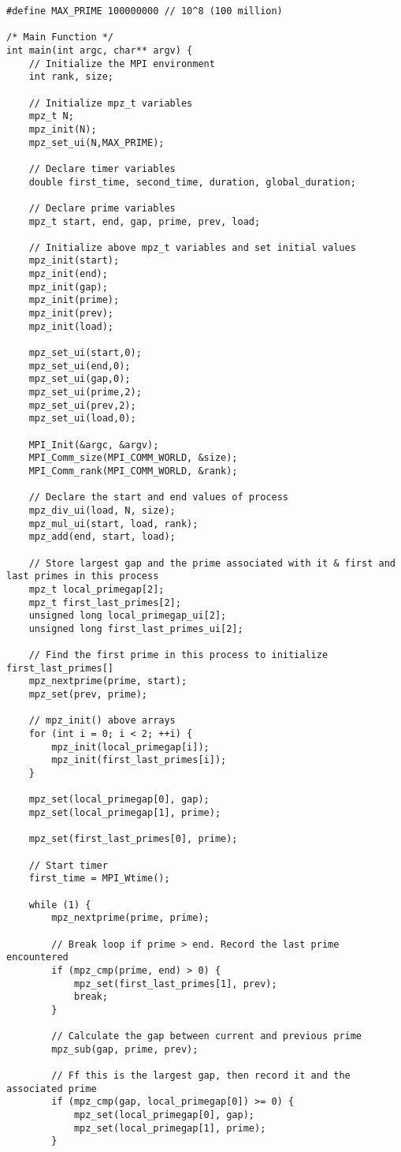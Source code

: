 \documentclass[12pt]{article}
\begin{document}
{\begin{lstlisting}
#define MAX_PRIME 100000000 // 10^8 (100 million)

/* Main Function */
int main(int argc, char** argv) {
	// Initialize the MPI environment
	int rank, size;

	// Initialize mpz_t variables
	mpz_t N;
	mpz_init(N);
	mpz_set_ui(N,MAX_PRIME);

	// Declare timer variables
	double first_time, second_time, duration, global_duration;

	// Declare prime variables
	mpz_t start, end, gap, prime, prev, load;

	// Initialize above mpz_t variables and set initial values
	mpz_init(start);
	mpz_init(end);
	mpz_init(gap);
	mpz_init(prime);
	mpz_init(prev);
	mpz_init(load);

	mpz_set_ui(start,0);
	mpz_set_ui(end,0);
	mpz_set_ui(gap,0);
	mpz_set_ui(prime,2);
	mpz_set_ui(prev,2);
	mpz_set_ui(load,0);

	MPI_Init(&argc, &argv);
	MPI_Comm_size(MPI_COMM_WORLD, &size);
	MPI_Comm_rank(MPI_COMM_WORLD, &rank);

	// Declare the start and end values of process
	mpz_div_ui(load, N, size);
	mpz_mul_ui(start, load, rank);
	mpz_add(end, start, load);

	// Store largest gap and the prime associated with it & first and last primes in this process
	mpz_t local_primegap[2]; 
	mpz_t first_last_primes[2]; 
	unsigned long local_primegap_ui[2];
	unsigned long first_last_primes_ui[2];

	// Find the first prime in this process to initialize first_last_primes[]
	mpz_nextprime(prime, start);
	mpz_set(prev, prime);

	// mpz_init() above arrays
	for (int i = 0; i < 2; ++i) {
		mpz_init(local_primegap[i]);
		mpz_init(first_last_primes[i]);
	}

	mpz_set(local_primegap[0], gap);
	mpz_set(local_primegap[1], prime);

	mpz_set(first_last_primes[0], prime);

	// Start timer
	first_time = MPI_Wtime();

	while (1) {
		mpz_nextprime(prime, prime);

		// Break loop if prime > end. Record the last prime encountered
		if (mpz_cmp(prime, end) > 0) {
			mpz_set(first_last_primes[1], prev);
			break;
		}

		// Calculate the gap between current and previous prime
		mpz_sub(gap, prime, prev);

		// Ff this is the largest gap, then record it and the associated prime
		if (mpz_cmp(gap, local_primegap[0]) >= 0) {
			mpz_set(local_primegap[0], gap);
			mpz_set(local_primegap[1], prime);
		}


\end{lstlisting}}
\end{document}
